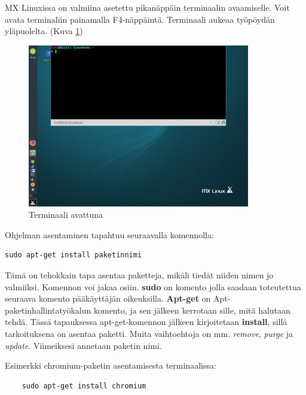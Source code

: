\documentclass[a4paper, 12pt, finnish]{article}
\begin{document}
MX Linuxissa on valmiina asetettu pikanäppäin terminaalin avaamiselle. Voit avata terminaliin painamalla F4-näppäintä. Terminaali aukeaa työpöydän yläpuolelta. (Kuva \ref{fig:terminal})
\begin{figure}[htpb]
    \begin{center}
        \includegraphics[width=0.866\textwidth]{ymparisto/terminal}
        \caption{Terminaali avattuna}
        \label{fig:terminal}
    \end{center}
\end{figure}

Ohjelman asentaminen tapahtuu seuraavalla komennolla:
\begin{lstlisting}
sudo apt-get install paketinnimi
\end{lstlisting}

Tämä on tehokkain tapa asentaa paketteja, mikäli tiedät niiden nimen jo valmiiksi. Komennon voi jakaa osiin. \textbf{sudo} on komento jolla saadaan toteutettua seuraava komento pääkäyttäjän oikeuksilla. \textbf{Apt-get} on Apt-paketinhallintatyökalun komento, ja sen jälkeen kerrotaan sille, mitä halutaan tehdä. Tässä tapauksessa apt-get-komennon jälkeen kirjoitetaan \textbf{install}, sillä tarkoituksena on asentaa paketti. Muita vaihtoehtoja on mm. \textit{remove}, \textit{purge} ja \textit{update}. Viimeiksesi annetaan paketin nimi. 

Esimerkki chromium-paketin asentamisesta terminaalissa:
\begin{lstlisting}
    sudo apt-get install chromium
\end{lstlisting}
\end{document}
